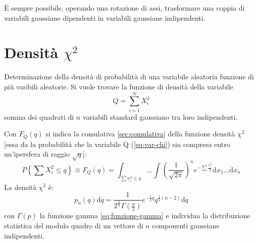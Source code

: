 \`E sempre possibile, operando una rotazione di assi, trasformare una coppia di variabili gaussiane dipendenti in variabili gaussiane indipendenti.

\section{Densità $\chi^2$} %
\label{sec:chi-quadro}
Determinazione della densità di probabilità di una variabile aleatoria funzione di più varibili aleatorie. Si vuole trovare la funzione di densità della variabile
\begin{equation}
\label{eq:var-chi}
Q=\sum _{ i=1 }^{ N }{ { X }_{ i }^{ 2 } } 
\end{equation}
somma dei quadrati di $n$ variabili standard gaussiano tra loro indipendenti.

Con $F_{Q}(q)$ si indica la comulativa \ref{sec:comulativa} della funzione densità $\chi ^2$ [essa da la probabilità che la variabile Q (\ref{eq:var-chi}) sia compresa entro un'ipersfera di raggio $\sqrt { q } $]:
\begin{equation}
P\left\{ \sum { { X }_{ i }^{ 2 } } \le q \right\} \equiv { F }_{ Q }\left( q \right) =\int _{ \sum { { x }_{ i }^{ 2 }\le q }  } \dots \int { { \left( \frac { 1 }{ \sqrt { 2\pi  }  }  \right)  }^{ n }{ e }^{ -\sum { \frac { { x }_{ i }^{ 2 } }{ 2 }  }  } \textrm{d}{ x }_{ 1 }\dots \textrm{d}x_{ n } } 
\end{equation}
La densità $\chi ^2$ è:
\begin{equation}
{ p }_{ n }\left( q \right) \textrm{d}q=\frac { 1 }{ { 2 }^{ \frac { n }{ 2 }  }\Gamma \left( \frac { n }{ 2 }  \right)  } { e }^{ -\frac { 1 }{ 2 } q }{ q }^{ \frac { 1 }{ 2 } \left( n-2 \right)  } \textrm{d}q
\end{equation}
con $\Gamma (p)$ la funzione gamma \ref{eq:funzione-gamma}
e individua la distribuzione statistica del modulo quadro di un vettore di $n$ componenti gaussiane indipendenti.

